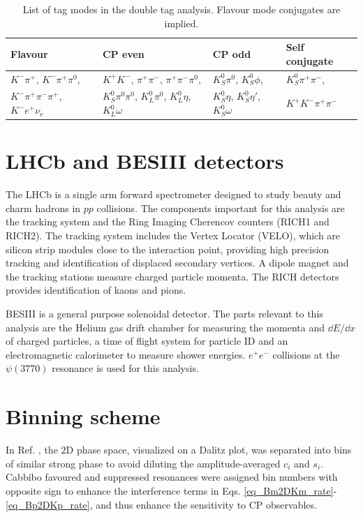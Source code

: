 \documentclass[12pt, a4paper, notitlepage, onecolumn]{article}
\begin{document}
\begin{table}[H]
  \centering
  \caption{List of tag modes in the double tag analysis. Flavour mode conjugates are implied.}
  \label{table_tag_modes}
  \begin{tabular}{llll} 
    \toprule
    Flavour & CP even & CP odd & Self conjugate \\
    \midrule
    $K^-\pi^+$, $K^-\pi^+\pi^0$,         & $K^+K^-$, $\pi^+\pi^-$, $\pi^+\pi^-\pi^0$,                  & $K_S^0\pi^0$, $K_S^0\phi$,               & $K_S^0\pi^+\pi^-$, \\
    $K^-\pi^+\pi^-\pi^+$, $K^- e^+\nu_e$ & $K_S^0\pi^0\pi^0$, $K_L^0\pi^0$, $K_L^0\eta$, $K_L^0\omega$ & $K_S^0\eta$, $K_S^0\eta'$, $K_S^0\omega$ & $K^+K^-\pi^+\pi^-$ \\
    \bottomrule
  \end{tabular}
\end{table}
\section{LHCb and BESIII detectors}
\noindent The LHCb \cite{cite_LHCb} is a single arm forward spectrometer designed to study beauty and charm hadrons in $pp$ collisions. The components important for this analysis are the tracking system and the Ring Imaging Cherencov counters (RICH1 and RICH2). The tracking system includes the Vertex Locator (VELO), which are silicon strip modules close to the interaction point, providing high precision tracking and identification of displaced secondary vertices. A dipole magnet and the tracking stations measure charged particle momenta. The RICH detectors provides identification of kaons and pions.

BESIII \cite{cite_BESIII} is a general purpose solenoidal detector. The parts relevant to this analysis are the Helium gas drift chamber for measuring the momenta and $\dd{E}/\dd{x}$ of charged particles, a time of flight system for particle ID and an electromagnetic calorimeter to measure shower energies. $e^+e^-$ collisions at the $\psi(3770)$ resonance is used for this analysis.

\section{Binning scheme}
\label{section_binning_scheme}
\noindent In Ref. \cite{cite_LHCbGGSZKSpipi}, the $2$D phase space, visualized on a Dalitz plot, was separated into bins of similar strong phase to avoid diluting the amplitude-averaged $c_i$ and $s_i$. Cabbibo favoured and suppressed resonances were assigned bin numbers with opposite sign to enhance the interference terms in Eqs. \eqref{eq_Bm2DKm_rate}-\eqref{eq_Bp2DKp_rate}, and thus enhance the sensitivity to CP observables.
\end{document}
